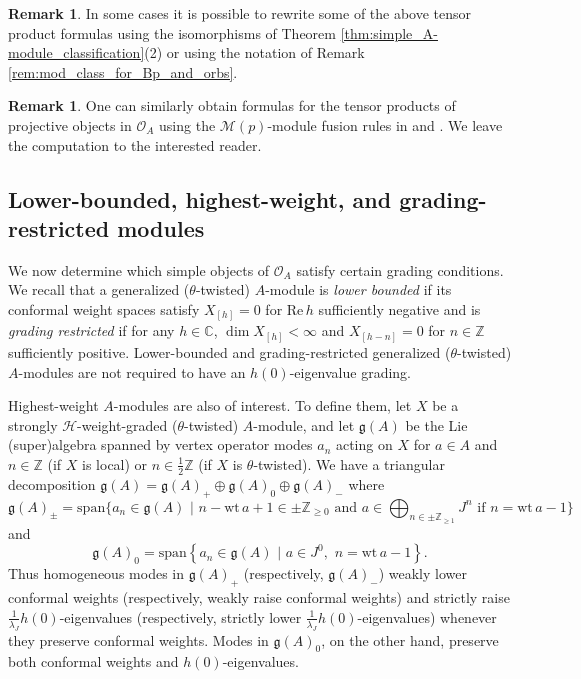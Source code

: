 \documentclass[11pt, reqno]{amsart}
\theoremstyle{definition}\newtheorem{defi}[thm]{Definition}
\theoremstyle{definition}\newtheorem{rem}[thm]{Remark}
\theoremstyle{definition}\newtheorem{exam}[thm]{Example}
\theoremstyle{definition}\newtheorem{assum}[thm]{Assumption}
\newcommand{\cH}{\mathcal{H}}
\newcommand{\cM}{\mathcal{M}}
\newcommand{\cO}{\mathcal{O}}
\newcommand{\CC}{\mathbb{C}}
\newcommand{\ZZ}{\mathbb{Z}}
\begin{document}
\begin{rem}
In some cases it is possible to rewrite some of the above tensor product formulas using the isomorphisms of Theorem \ref{thm:simple_A-module_classification}(2) or using the notation of Remark \ref{rem:mod_class_for_Bp_and_orbs}.
\end{rem}

\begin{rem}\label{rem:projective_fusion}
One can similarly obtain formulas for the tensor products of projective objects in $\cO_A$ using the $\cM(p)$-module fusion rules in \cite[Theorem 5.2.1]{CMY-singlet} and \cite[Theorem 4.3]{CMY-singlet-typical}. We leave the computation to the interested reader.
\end{rem}


\subsection{Lower-bounded, highest-weight, and grading-restricted modules}\label{subsec:lb_hw_gr}

We now determine which simple objects of $\cO_A$ satisfy certain grading conditions. We recall that a generalized ($\theta$-twisted) $A$-module is \textit{lower bounded} if its conformal weight spaces satisfy $X_{[h]}=0$ for $\mathrm{Re}\,h$ sufficiently negative and is \textit{grading restricted} if for any $h\in\CC$, $\dim X_{[h]}<\infty$ and $X_{[h-n]}=0$ for $n\in\ZZ$ sufficiently positive. Lower-bounded and grading-restricted generalized ($\theta$-twisted) $A$-modules are not required to have an $h(0)$-eigenvalue grading.

Highest-weight $A$-modules are also of interest. To define them, let $X$ be a strongly $\cH$-weight-graded ($\theta$-twisted) $A$-module, and let $\mathfrak{g}(A)$ be the Lie (super)algebra spanned by vertex operator modes $a_n$ acting on $X$ for $a\in A$ and $n\in\ZZ$ (if $X$ is local) or $n\in\frac{1}{2}\ZZ$ (if $X$ is $\theta$-twisted). We have a triangular decomposition $\mathfrak{g}(A)=\mathfrak{g}(A)_+\oplus\mathfrak{g}(A)_0\oplus\mathfrak{g}(A)_-$ where
\begin{equation*}
\mathfrak{g}(A)_{\pm} =\mathrm{span}\bigg\lbrace a_n\in\mathfrak{g}(A)\,\,\bigg\vert\,\, n-\mathrm{wt}\,a+1\in\pm\ZZ_{\geq 0}\,\,\text{and}\,\,a\in\bigoplus_{n\in\pm\ZZ_{\geq 1}} J^n\,\,\text{if}\,\,n=\mathrm{wt}\,a-1\bigg\rbrace
\end{equation*}
and 
\begin{equation*}
\mathfrak{g}(A)_0=\mathrm{span}\left\lbrace a_n\in\mathfrak{g}(A)\,\,\vert\,\,a\in J^0,\,\,n=\mathrm{wt}\,a-1\right\rbrace.
\end{equation*}
Thus homogeneous modes in $\mathfrak{g}(A)_+$ (respectively, $\mathfrak{g}(A)_-$) weakly lower conformal weights (respectively, weakly raise conformal weights) and strictly raise $\frac{1}{\lambda_J}h(0)$-eigenvalues (respectively, strictly lower $\frac{1}{\lambda_J}h(0)$-eigenvalues) whenever they preserve conformal weights. Modes in $\mathfrak{g}(A)_0$, on the other hand, preserve both conformal weights and $h(0)$-eigenvalues.
\end{document}
